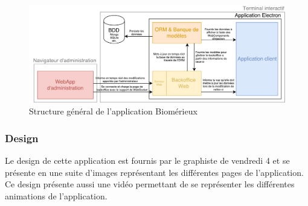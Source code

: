 \documentclass{article}
\begin{document}
\begin{landscape}
    \begin{figure}[h]
        \centering
        \includegraphics[scale=0.9]{Proposition-utopia.pdf}
        \caption{Structure général de l'application Biomérieux}
    \end{figure}
\end{landscape}

\clearpage

\subsubsection{Design}

Le design de cette application est fournis par le graphiste de vendredi 4 et se présente en une suite d'images représentant les différentes pages de l'application.
Ce design présente aussi une vidéo permettant de se représenter les différentes animations de l'application.
\end{document}

